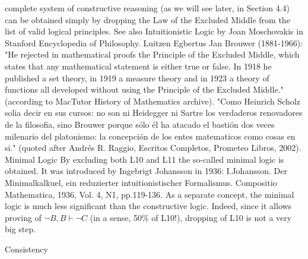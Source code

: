 complete system of constructive reasoning (as we will see later, in Section 4.4) can be obtained simply by
dropping the Law of the Excluded Middle from the list of valid logical principles.
See also Intuitionistic Logic by Joan Moschovakis in Stanford Encyclopedia of Philosophy.
Luitzen Egbertus Jan Brouwer (1881-1966): "He rejected in mathematical proofs the Principle of the Excluded Middle, which
states that any mathematical statement is either true or false. In 1918 he published a set theory, in 1919 a measure theory and in
1923 a theory of functions all developed without using the Principle of the Excluded Middle." (according to MacTutor History
of Mathematics archive). "Como Heinrich Scholz solia decir en sus cursos: no son ni Heidegger ni Sartre los verdaderos
renovadores de la filosofia, sino Brouwer porque sólo él ha atacado el bastión dos veces milenario del platonismo: la
concepción de los entes matematicos como cosas en si." (quoted after Andrés R. Raggio, Escritos Completos, Prometeo Libros,
2002).
Minimal Logic
By excluding both L10 and L11 the so-called minimal logic is obtained. It was introduced by Ingebrigt
Johansson in 1936:
I.Johansson. Der Minimalkalkuel, ein reduzierter intuitionistischer Formalismus. Compositio Mathematica, 1936, Vol. 4, N1,
pp.119-136.
As a separate concept, the minimal logic is much less significant than the constructive logic. Indeed, since
it allows proving of \(\neg B, B \vdash \neg C\) (in a sense, 50\% of L10!), dropping of L10 is not a very big step.

Consistency

